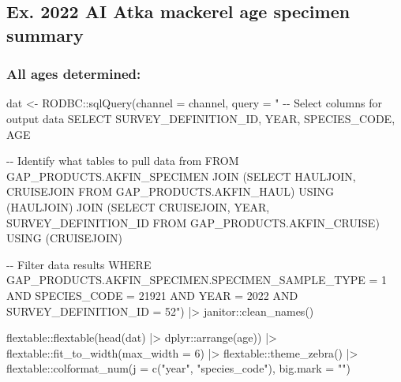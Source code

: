 \documentclass[
  letterpaper,
  oneside,
  open=any]{scrbook}
\newenvironment{Shaded}{\begin{snugshade}}{\end{snugshade}}
\newcommand{\AttributeTok}[1]{\textcolor[rgb]{0.40,0.45,0.13}{#1}}
\newcommand{\DecValTok}[1]{\textcolor[rgb]{0.68,0.00,0.00}{#1}}
\newcommand{\FunctionTok}[1]{\textcolor[rgb]{0.28,0.35,0.67}{#1}}
\newcommand{\NormalTok}[1]{\textcolor[rgb]{0.00,0.23,0.31}{#1}}
\newcommand{\OtherTok}[1]{\textcolor[rgb]{0.00,0.23,0.31}{#1}}
\newcommand{\SpecialCharTok}[1]{\textcolor[rgb]{0.37,0.37,0.37}{#1}}
\newcommand{\StringTok}[1]{\textcolor[rgb]{0.13,0.47,0.30}{#1}}
\begin{document}
\subsection{Ex. 2022 AI Atka mackerel age specimen
summary}\label{ex.-2022-ai-atka-mackerel-age-specimen-summary}

\subsubsection{All ages determined:}\label{all-ages-determined}

\begin{Shaded}
\begin{Highlighting}[]
\NormalTok{dat }\OtherTok{\textless{}{-}}\NormalTok{ RODBC}\SpecialCharTok{::}\FunctionTok{sqlQuery}\NormalTok{(}\AttributeTok{channel =}\NormalTok{ channel,}
                       \AttributeTok{query =} \StringTok{"}
\StringTok{{-}{-} Select columns for output data}
\StringTok{SELECT SURVEY\_DEFINITION\_ID, YEAR, SPECIES\_CODE, AGE}

\StringTok{{-}{-} Identify what tables to pull data from}
\StringTok{FROM GAP\_PRODUCTS.AKFIN\_SPECIMEN}
\StringTok{JOIN (SELECT HAULJOIN, CRUISEJOIN FROM GAP\_PRODUCTS.AKFIN\_HAUL)}
\StringTok{USING (HAULJOIN)}
\StringTok{JOIN (SELECT CRUISEJOIN, YEAR, SURVEY\_DEFINITION\_ID FROM GAP\_PRODUCTS.AKFIN\_CRUISE)}
\StringTok{USING (CRUISEJOIN)}

\StringTok{{-}{-} Filter data results}
\StringTok{WHERE GAP\_PRODUCTS.AKFIN\_SPECIMEN.SPECIMEN\_SAMPLE\_TYPE = 1}
\StringTok{AND SPECIES\_CODE = 21921}
\StringTok{AND YEAR = 2022}
\StringTok{AND SURVEY\_DEFINITION\_ID = 52"}\NormalTok{) }\SpecialCharTok{|\textgreater{}} 
\NormalTok{  janitor}\SpecialCharTok{::}\FunctionTok{clean\_names}\NormalTok{()}
\end{Highlighting}
\end{Shaded}

\begin{Shaded}
\begin{Highlighting}[]
\NormalTok{flextable}\SpecialCharTok{::}\FunctionTok{flextable}\NormalTok{(}\FunctionTok{head}\NormalTok{(dat) }\SpecialCharTok{|\textgreater{}} 
\NormalTok{                       dplyr}\SpecialCharTok{::}\FunctionTok{arrange}\NormalTok{(age)) }\SpecialCharTok{|\textgreater{}}
\NormalTok{  flextable}\SpecialCharTok{::}\FunctionTok{fit\_to\_width}\NormalTok{(}\AttributeTok{max\_width =} \DecValTok{6}\NormalTok{) }\SpecialCharTok{|\textgreater{}} 
\NormalTok{  flextable}\SpecialCharTok{::}\FunctionTok{theme\_zebra}\NormalTok{() }\SpecialCharTok{|\textgreater{}}
\NormalTok{  flextable}\SpecialCharTok{::}\FunctionTok{colformat\_num}\NormalTok{(}\AttributeTok{j =} \FunctionTok{c}\NormalTok{(}\StringTok{"year"}\NormalTok{, }\StringTok{"species\_code"}\NormalTok{), }\AttributeTok{big.mark =} \StringTok{""}\NormalTok{)}
\end{Highlighting}
\end{Shaded}
\end{document}
